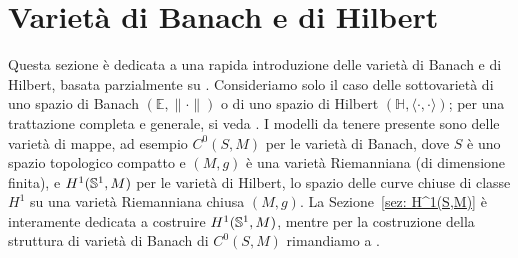 \section{Varietà di Banach e di Hilbert}\label{sez: var Banach/Hilbert}
Questa sezione è dedicata a una rapida introduzione delle varietà di Banach e di Hilbert, basata parzialmente su \cite[Section~6.1]{ambrosetti2007nonlinear}. Consideriamo solo il caso delle sottovarietà di uno spazio di Banach \((\mathbb{E}, \| \cdot\|)\) o di uno spazio di Hilbert \((\mathbb{H}, \langle \cdot, \cdot \rangle)\); per una trattazione completa e generale, si veda \cite{lang2001fundamentals}.  I modelli da tenere presente sono delle varietà di mappe, ad esempio \(C^0(S,M)\) per le varietà di Banach, dove \(S\) è uno spazio topologico compatto e \((M,g)\) è una varietà Riemanniana (di dimensione finita), e \(H^1(\mathbb{S}^1,M)\) per le varietà di Hilbert, lo spazio delle curve chiuse di classe \(H^1\) su una varietà Riemanniana chiusa \((M,g)\). La Sezione~\ref{sez: H^1(S,M)} è interamente dedicata a costruire \(H^1(\mathbb{S}^1,M)\), mentre per la costruzione della struttura di varietà di Banach di \(C^0(S,M)\) rimandiamo a \cite{eells1958geometry}. 

